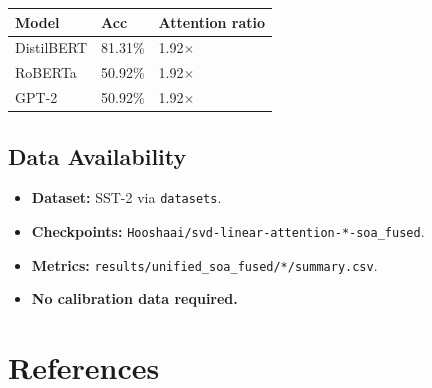 \begin{table}[H]
\centering
\small
\begin{tabular}{lll}
\toprule
\textbf{Model} & \textbf{Acc} & \textbf{Attention ratio} \\
\midrule
DistilBERT & 81.31\% & 1.92$\times$ \\
RoBERTa & 50.92\% & 1.92$\times$ \\
GPT-2 & 50.92\% & 1.92$\times$ \\
\bottomrule
\end{tabular}
\end{table}

\subsection{Data Availability}

\begin{itemize}
\item \textbf{Dataset:} SST-2 via \texttt{datasets}.
\item \textbf{Checkpoints:} \texttt{Hooshaai/svd-linear-attention-*-soa\_fused}.
\item \textbf{Metrics:} \texttt{results/unified\_soa\_fused/*/summary.csv}.
\item \textbf{No calibration data required.}

\end{itemize}


\section{References}

